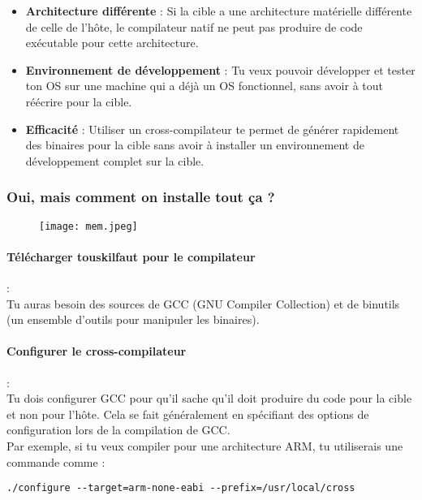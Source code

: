 \documentclass{article}
\begin{document}
\begin{itemize}
    \item \textbf{Architecture différente} : Si la cible a une architecture matérielle différente de celle de l'hôte, le compilateur natif ne peut pas produire de code exécutable pour cette architecture.
    
    \item \textbf{Environnement de développement} : Tu veux pouvoir développer et tester ton OS sur une machine qui a déjà un OS fonctionnel, sans avoir à tout réécrire pour la cible.
    
    \item \textbf{Efficacité} : Utiliser un cross-compilateur te permet de générer rapidement des binaires pour la cible sans avoir à installer un environnement de développement complet sur la cible.
\end{itemize}

\subsubsection*{Oui, mais comment on installe tout ça ?}

\begin{figure}[h!]
    \centering
    \texttt{[image: mem.jpeg]}
    \label{fig:logo1}
\end{figure}

\paragraph{Télécharger touskilfaut pour le compilateur}
:\\Tu auras besoin des sources de GCC (GNU Compiler Collection) et de binutils (un ensemble d'outils pour manipuler les binaires).

\paragraph{Configurer le cross-compilateur}
:\\Tu dois configurer GCC pour qu'il sache qu'il doit produire du code pour la cible et non pour l'hôte. Cela se fait généralement en spécifiant des options de configuration lors de la compilation de GCC.\\

Par exemple, si tu veux compiler pour une architecture ARM, tu utiliserais une commande comme :

\begin{lstlisting}
./configure --target=arm-none-eabi --prefix=/usr/local/cross
\end{lstlisting}
\end{document}
